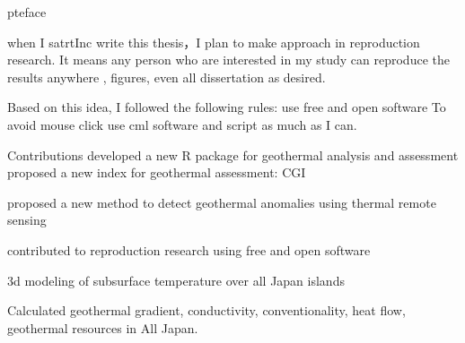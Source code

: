 pteface

when I satrtInc write this thesis，I plan to make approach in reproduction research.
It means any person who are interested
in my study can reproduce the results anywhere , figures, even all dissertation as desired.

Based on this idea, I followed
 the following rules:
use free and open software 
To avoid mouse click 
use cml software and script as much as I can. 

Contributions 
developed a new R package for geothermal
analysis and assessment 
proposed  a new index for geothermal assessment: CGI

proposed  a new method to detect geothermal anomalies using thermal remote sensing 

contributed to reproduction research using free and open software 

3d modeling of subsurface temperature over all Japan islands 

Calculated geothermal gradient,  conductivity,  conventionality, heat flow, geothermal resources in All Japan. 


 
